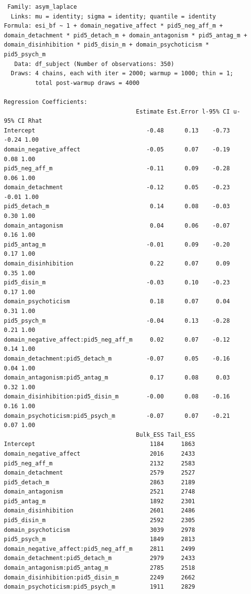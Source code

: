 \documentclass[
  11pt,
  a4paper,
  onecolumn]{article}
\begin{document}
\begin{verbatim}
 Family: asym_laplace 
  Links: mu = identity; sigma = identity; quantile = identity 
Formula: esi_bf ~ 1 + domain_negative_affect * pid5_neg_aff_m + domain_detachment * pid5_detach_m + domain_antagonism * pid5_antag_m + domain_disinhibition * pid5_disin_m + domain_psychoticism * pid5_psych_m 
   Data: df_subject (Number of observations: 350) 
  Draws: 4 chains, each with iter = 2000; warmup = 1000; thin = 1;
         total post-warmup draws = 4000

Regression Coefficients:
                                      Estimate Est.Error l-95% CI u-95% CI Rhat
Intercept                                -0.48      0.13    -0.73    -0.24 1.00
domain_negative_affect                   -0.05      0.07    -0.19     0.08 1.00
pid5_neg_aff_m                           -0.11      0.09    -0.28     0.06 1.00
domain_detachment                        -0.12      0.05    -0.23    -0.01 1.00
pid5_detach_m                             0.14      0.08    -0.03     0.30 1.00
domain_antagonism                         0.04      0.06    -0.07     0.16 1.00
pid5_antag_m                             -0.01      0.09    -0.20     0.17 1.00
domain_disinhibition                      0.22      0.07     0.09     0.35 1.00
pid5_disin_m                             -0.03      0.10    -0.23     0.17 1.00
domain_psychoticism                       0.18      0.07     0.04     0.31 1.00
pid5_psych_m                             -0.04      0.13    -0.28     0.21 1.00
domain_negative_affect:pid5_neg_aff_m     0.02      0.07    -0.12     0.14 1.00
domain_detachment:pid5_detach_m          -0.07      0.05    -0.16     0.04 1.00
domain_antagonism:pid5_antag_m            0.17      0.08     0.03     0.32 1.00
domain_disinhibition:pid5_disin_m        -0.00      0.08    -0.16     0.16 1.00
domain_psychoticism:pid5_psych_m         -0.07      0.07    -0.21     0.07 1.00
                                      Bulk_ESS Tail_ESS
Intercept                                 1184     1863
domain_negative_affect                    2016     2433
pid5_neg_aff_m                            2132     2583
domain_detachment                         2579     2527
pid5_detach_m                             2863     2189
domain_antagonism                         2521     2748
pid5_antag_m                              1892     2301
domain_disinhibition                      2601     2486
pid5_disin_m                              2592     2305
domain_psychoticism                       3039     2978
pid5_psych_m                              1849     2813
domain_negative_affect:pid5_neg_aff_m     2811     2499
domain_detachment:pid5_detach_m           2979     2433
domain_antagonism:pid5_antag_m            2785     2518
domain_disinhibition:pid5_disin_m         2249     2662
domain_psychoticism:pid5_psych_m          1911     2829


\end{verbatim}
\end{document}

